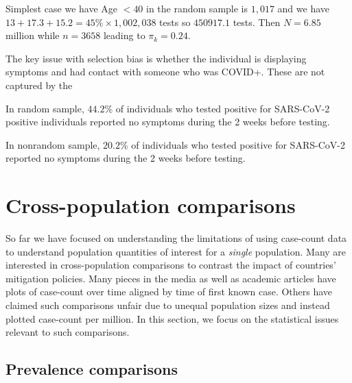 \documentclass[11pt]{amsart}
\begin{document}
Simplest case we have Age $<40$ in the random sample is $1,017$ and we have $13+17.3+15.2 = 45\% \times 1,002,038$ tests so $450917.1$ tests. Then $N = 6.85$ million while $n = 3658$ leading to $\pi_k = 0.24$.


\begin{rmk}
The key issue with selection bias is whether the individual is displaying symptoms and had contact with someone who was COVID+.  These are not captured by the

In random sample, $44.2$\% of individuals who tested positive for SARS-CoV-2 positive individuals reported no symptoms during the 2 weeks before testing.

In nonrandom sample, $20.2$\% of individuals who tested positive for SARS-CoV-2 reported no symptoms during the 2 weeks before testing.

\end{rmk}


\section{Cross-population comparisons}
\label{section:crosspop}
So far we have focused on understanding the limitations of using case-count data to understand population quantities of interest for a \emph{single} population.  Many are interested in cross-population comparisons to contrast the impact of countries' mitigation policies.  Many pieces in the media as well as academic articles have plots of case-count over time aligned by time of first known case.  Others have claimed such comparisons unfair due to unequal population sizes and instead plotted case-count per million.  In this section, we focus on the statistical issues relevant to such comparisons.

\subsection{Prevalence comparisons}
\end{document}
